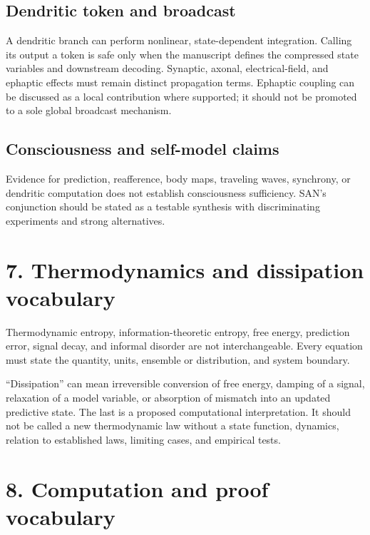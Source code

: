\documentclass[
  american,
  11pt,
  letterpaper,
]{article}
\begin{document}
\subsection{Dendritic token and broadcast}\label{dendritic-token-and-broadcast}

A dendritic branch can perform nonlinear, state-dependent integration. Calling its output a token is safe only when the manuscript defines the compressed state variables and downstream decoding. Synaptic, axonal, electrical-field, and ephaptic effects must remain distinct propagation terms. Ephaptic coupling can be discussed as a local contribution where supported; it should not be promoted to a sole global broadcast mechanism.

\subsection{Consciousness and self-model claims}\label{consciousness-and-self-model-claims}

Evidence for prediction, reafference, body maps, traveling waves, synchrony, or dendritic computation does not establish consciousness sufficiency. SAN's conjunction should be stated as a testable synthesis with discriminating experiments and strong alternatives.

\section{7. Thermodynamics and dissipation vocabulary}\label{thermodynamics-and-dissipation-vocabulary}

Thermodynamic entropy, information-theoretic entropy, free energy, prediction error, signal decay, and informal disorder are not interchangeable. Every equation must state the quantity, units, ensemble or distribution, and system boundary.

``Dissipation'' can mean irreversible conversion of free energy, damping of a signal, relaxation of a model variable, or absorption of mismatch into an updated predictive state. The last is a proposed computational interpretation. It should not be called a new thermodynamic law without a state function, dynamics, relation to established laws, limiting cases, and empirical tests.

\section{8. Computation and proof vocabulary}\label{computation-and-proof-vocabulary}
\end{document}
